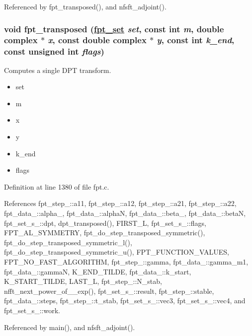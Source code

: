 Referenced by fpt\_\-transposed(), and nfsft\_\-adjoint().\hypertarget{group__fpt_ga6}{
\subsubsection[fpt\_\-transposed]{\setlength{\rightskip}{0pt plus 5cm}void fpt\_\-transposed (\hyperlink{structfpt__set__s__}{fpt\_\-set} {\em set}, const int {\em m}, double complex $\ast$ {\em x}, const double complex $\ast$ {\em y}, const int {\em k\_\-end}, const unsigned int {\em flags})}}
\label{group__fpt_ga6}


Computes a single DPT transform. 

\begin{itemize}
\item set \item m \item x \item y \item k\_\-end \item flags \end{itemize}


Definition at line 1380 of file fpt.c.

References fpt\_\-step\_\-::a11, fpt\_\-step\_\-::a12, fpt\_\-step\_\-::a21, fpt\_\-step\_\-::a22, fpt\_\-data\_\-::alpha\_, fpt\_\-data\_\-::alpha\-N, fpt\_\-data\_\-::beta\_, fpt\_\-data\_\-::beta\-N, fpt\_\-set\_\-s\_\-::dpt, dpt\_\-transposed(), FIRST\_\-L, fpt\_\-set\_\-s\_\-::flags, FPT\_\-AL\_\-SYMMETRY, fpt\_\-do\_\-step\_\-transposed\_\-symmetric(), fpt\_\-do\_\-step\_\-transposed\_\-symmetric\_\-l(), fpt\_\-do\_\-step\_\-transposed\_\-symmetric\_\-u(), FPT\_\-FUNCTION\_\-VALUES, FPT\_\-NO\_\-FAST\_\-ALGORITHM, fpt\_\-step\_\-::gamma, fpt\_\-data\_\-::gamma\_\-m1, fpt\_\-data\_\-::gamma\-N, K\_\-END\_\-TILDE, fpt\_\-data\_\-::k\_\-start, K\_\-START\_\-TILDE, LAST\_\-L, fpt\_\-step\_\-::N\_\-stab, nfft\_\-next\_\-power\_\-of\_\_\-exp(), fpt\_\-set\_\-s\_\-::result, fpt\_\-step\_\-::stable, fpt\_\-data\_\-::steps, fpt\_\-step\_\-::t\_\-stab, fpt\_\-set\_\-s\_\-::vec3, fpt\_\-set\_\-s\_\-::vec4, and fpt\_\-set\_\-s\_\-::work.

Referenced by main(), and nfsft\_\-adjoint().